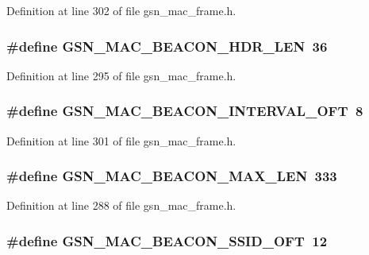 Definition at line 302 of file gsn\_\-mac\_\-frame.h.

\hypertarget{a00523_ad98484f6aa4389a8c2273ba17ce2242f}{
\subsubsection[{GSN\_\-MAC\_\-BEACON\_\-HDR\_\-LEN}]{\setlength{\rightskip}{0pt plus 5cm}\#define GSN\_\-MAC\_\-BEACON\_\-HDR\_\-LEN~36}}
\label{a00523_ad98484f6aa4389a8c2273ba17ce2242f}


Definition at line 295 of file gsn\_\-mac\_\-frame.h.

\hypertarget{a00523_a98d352d869b285fd57a3b650df6ec7ed}{
\subsubsection[{GSN\_\-MAC\_\-BEACON\_\-INTERVAL\_\-OFT}]{\setlength{\rightskip}{0pt plus 5cm}\#define GSN\_\-MAC\_\-BEACON\_\-INTERVAL\_\-OFT~8}}
\label{a00523_a98d352d869b285fd57a3b650df6ec7ed}


Definition at line 301 of file gsn\_\-mac\_\-frame.h.

\hypertarget{a00523_ad4cadb552f8ae1f86b629a6cd2f4067e}{
\subsubsection[{GSN\_\-MAC\_\-BEACON\_\-MAX\_\-LEN}]{\setlength{\rightskip}{0pt plus 5cm}\#define GSN\_\-MAC\_\-BEACON\_\-MAX\_\-LEN~333}}
\label{a00523_ad4cadb552f8ae1f86b629a6cd2f4067e}


Definition at line 288 of file gsn\_\-mac\_\-frame.h.

\hypertarget{a00523_aabc5297018b37522a1a701f77d20c62c}{
\subsubsection[{GSN\_\-MAC\_\-BEACON\_\-SSID\_\-OFT}]{\setlength{\rightskip}{0pt plus 5cm}\#define GSN\_\-MAC\_\-BEACON\_\-SSID\_\-OFT~12}}
\label{a00523_aabc5297018b37522a1a701f77d20c62c}


